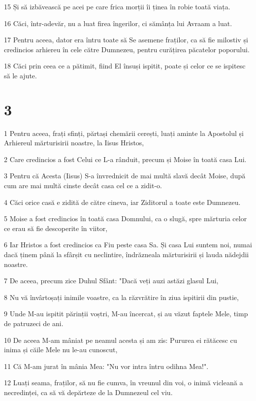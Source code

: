 \par 15 Și să izbăvească pe acei pe care frica morții îi ținea în robie toată viața.
\par 16 Căci, într-adevăr, nu a luat firea îngerilor, ci sămânța lui Avraam a luat.
\par 17 Pentru aceea, dator era întru toate să Se asemene fraților, ca să fie milostiv și credincios arhiereu în cele către Dumnezeu, pentru curățirea păcatelor poporului.
\par 18 Căci prin ceea ce a pătimit, fiind El însuși ispitit, poate și celor ce se ispitesc să le ajute.

\chapter{3}

\par 1 Pentru aceea, frați sfinți, părtași chemării cerești, luați aminte la Apostolul și Arhiereul mărturisirii noastre, la Iisus Hristos,
\par 2 Care credincios a fost Celui ce L-a rânduit, precum și Moise în toată casa Lui.
\par 3 Pentru că Acesta (Iisus) S-a învrednicit de mai multă slavă decât Moise, după cum are mai multă cinste decât casa cel ce a zidit-o.
\par 4 Căci orice casă e zidită de către cineva, iar Ziditorul a toate este Dumnezeu.
\par 5 Moise a fost credincios în toată casa Domnului, ca o slugă, spre mărturia celor ce erau să fie descoperite în viitor,
\par 6 Iar Hristos a fost credincios ca Fiu peste casa Sa. Și casa Lui suntem noi, numai dacă ținem până la sfârșit cu neclintire, îndrăzneala mărturisirii și lauda nădejdii noastre.
\par 7 De aceea, precum zice Duhul Sfânt: "Dacă veți auzi astăzi glasul Lui,
\par 8 Nu vă învârtoșați inimile voastre, ca la răzvrătire în ziua ispitirii din pustie,
\par 9 Unde M-au ispitit părinții voștri, M-au încercat, și au văzut faptele Mele, timp de patruzeci de ani.
\par 10 De aceea M-am mâniat pe neamul acesta și am zis: Pururea ei rătăcesc cu inima și căile Mele nu le-au cunoscut,
\par 11 Că M-am jurat în mânia Mea: "Nu vor intra întru odihna Mea!".
\par 12 Luați seama, fraților, să nu fie cumva, în vreunul din voi, o inimă vicleană a necredinței, ca să vă depărteze de la Dumnezeul cel viu.
